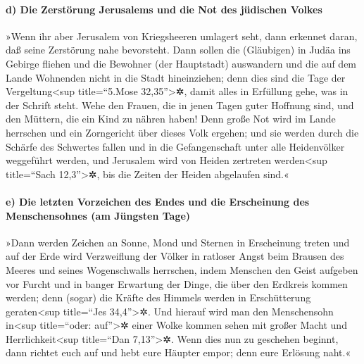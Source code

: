 \hypertarget{d-die-zerstuxf6rung-jerusalems-und-die-not-des-juxfcdischen-volkes}{%
\paragraph{d) Die Zerstörung Jerusalems und die Not des jüdischen
Volkes}\label{d-die-zerstuxf6rung-jerusalems-und-die-not-des-juxfcdischen-volkes}}

 »Wenn ihr aber Jerusalem von Kriegsheeren umlagert seht,
dann erkennet daran, daß seine Zerstörung nahe bevorsteht.
 Dann sollen die (Gläubigen) in Judäa ins Gebirge fliehen
und die Bewohner (der Hauptstadt) auswandern und die auf dem Lande
Wohnenden nicht in die Stadt hineinziehen;  denn dies
sind die Tage der Vergeltung\textless sup title=``5.Mose
32,35''\textgreater✲, damit alles in Erfüllung gehe, was in der Schrift
steht.  Wehe den Frauen, die in jenen Tagen guter
Hoffnung sind, und den Müttern, die ein Kind zu nähren haben! Denn große
Not wird im Lande herrschen und ein Zorngericht über dieses Volk
ergehen;  und sie werden durch die Schärfe des Schwertes
fallen und in die Gefangenschaft unter alle Heidenvölker weggeführt
werden, und Jerusalem wird von Heiden zertreten werden\textless sup
title=``Sach 12,3''\textgreater✲, bis die Zeiten der Heiden abgelaufen
sind.«

\hypertarget{e-die-letzten-vorzeichen-des-endes-und-die-erscheinung-des-menschensohnes-am-juxfcngsten-tage}{%
\paragraph{e) Die letzten Vorzeichen des Endes und die Erscheinung des
Menschensohnes (am Jüngsten
Tage)}\label{e-die-letzten-vorzeichen-des-endes-und-die-erscheinung-des-menschensohnes-am-juxfcngsten-tage}}

 »Dann werden Zeichen an Sonne, Mond und Sternen in
Erscheinung treten und auf der Erde wird Verzweiflung der Völker in
ratloser Angst beim Brausen des Meeres und seines Wogenschwalls
herrschen,  indem Menschen den Geist aufgeben vor Furcht
und in banger Erwartung der Dinge, die über den Erdkreis kommen werden;
denn (sogar) die Kräfte des Himmels werden in Erschütterung
geraten\textless sup title=``Jes 34,4''\textgreater✲. 
Und hierauf wird man den Menschensohn in\textless sup title=``oder:
auf''\textgreater✲ einer Wolke kommen sehen mit großer Macht und
Herrlichkeit\textless sup title=``Dan 7,13''\textgreater✲.
 Wenn dies nun zu geschehen beginnt, dann richtet euch
auf und hebt eure Häupter empor; denn eure Erlösung naht.«

